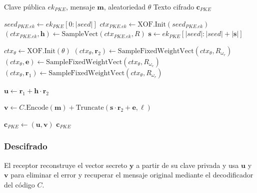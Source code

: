 \begin{tcolorbox}[hqcbox,title=\textbf{Algoritmo HQC–PKE.Encrypt}]
\begin{algorithmic}[1]
\Require Clave pública $\textit{ek}_{PKE}$, mensaje $\mathbf{m}$, aleatoriedad $\theta$
\Ensure Texto cifrado $\mathbf{c}_{PKE}$

\State $\textit{seed}_{PKE.ek} \gets \textit{ek}_{PKE}[0{:}|\textit{seed}|]$
\State $\textit{ctx}_{PKE.ek} \gets \text{XOF.Init}(\textit{seed}_{PKE.ek})$
\State $(\textit{ctx}_{PKE.ek}, \mathbf{h}) \gets \text{SampleVect}(\textit{ctx}_{PKE.ek}, R)$
\State $\mathbf{s} \gets \textit{ek}_{PKE}[|\textit{seed}|{:}|\textit{seed}|+|\mathbf{s}|]$

\State $\textit{ctx}_\theta \gets \text{XOF.Init}(\theta)$
\State $(\textit{ctx}_\theta, \mathbf{r}_2) \gets \text{SampleFixedWeightVect}(\textit{ctx}_\theta, R_{\omega_r})$
\State $(\textit{ctx}_\theta, \mathbf{e})  \gets \text{SampleFixedWeightVect}(\textit{ctx}_\theta, R_{\omega_e})$
\State $(\textit{ctx}_\theta, \mathbf{r}_1) \gets \text{SampleFixedWeightVect}(\textit{ctx}_\theta, R_{\omega_r})$

\State $\mathbf{u} \gets \mathbf{r}_1 + \mathbf{h}\cdot\mathbf{r}_2$

\State $\mathbf{v} \gets C.\text{Encode}(\mathbf{m}) + \text{Truncate}(\mathbf{s}\cdot\mathbf{r}_2 + \mathbf{e}, \ell)$

\State $\mathbf{c}_{PKE} \gets (\mathbf{u}, \mathbf{v})$
\State \Return $\mathbf{c}_{PKE}$
\end{algorithmic}
\end{tcolorbox}

\subsubsection{Descifrado}
El receptor reconstruye el vector secreto $\mathbf{y}$ a partir de su clave privada y usa $\mathbf{u}$ y $\mathbf{v}$ para eliminar el error y recuperar el mensaje original mediante el decodificador del código $C$.

